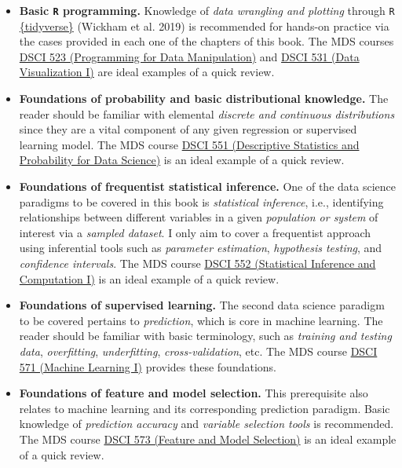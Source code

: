 \documentclass[
  letterpaper,
  DIV=11,
  numbers=noendperiod]{scrreprt}
\providecommand{\tightlist}{%
  \setlength{\itemsep}{0pt}\setlength{\parskip}{0pt}}\usepackage{longtable,booktabs,array}
\begin{document}
\begin{itemize}
\tightlist
\item
  \textbf{Basic \texttt{R} programming.} Knowledge of \emph{data
  wrangling and plotting} through \texttt{R}
  \href{https://www.tidyverse.org}{\{tidyverse\}} (Wickham et al. 2019)
  is recommended for hands-on practice via the cases provided in each
  one of the chapters of this book. The MDS courses
  \href{https://github.com/UBC-MDS/DSCI_523_r-prog}{DSCI 523
  (Programming for Data Manipulation)} and
  \href{https://github.com/UBC-MDS/DSCI_531_viz-1}{DSCI 531 (Data
  Visualization I)} are ideal examples of a quick review.
\item
  \textbf{Foundations of probability and basic distributional
  knowledge.} The reader should be familiar with elemental
  \emph{discrete and continuous distributions} since they are a vital
  component of any given regression or supervised learning model. The
  MDS course
  \href{https://ubc-mds.github.io/course-descriptions/DSCI_551_eda-dsci/}{DSCI
  551 (Descriptive Statistics and Probability for Data Science)} is an
  ideal example of a quick review.
\item
  \textbf{Foundations of frequentist statistical inference.} One of the
  data science paradigms to be covered in this book is \emph{statistical
  inference}, i.e., identifying relationships between different
  variables in a given \emph{population or system} of interest via a
  \emph{sampled dataset}. I only aim to cover a frequentist approach
  using inferential tools such as \emph{parameter estimation},
  \emph{hypothesis testing}, and \emph{confidence intervals}. The MDS
  course \href{https://github.com/UBC-MDS/DSCI_552_stat-inf-1}{DSCI 552
  (Statistical Inference and Computation I)} is an ideal example of a
  quick review.
\item
  \textbf{Foundations of supervised learning.} The second data science
  paradigm to be covered pertains to \emph{prediction}, which is core in
  machine learning. The reader should be familiar with basic
  terminology, such as \emph{training and testing data},
  \emph{overfitting}, \emph{underfitting}, \emph{cross-validation}, etc.
  The MDS course
  \href{https://github.com/UBC-MDS/DSCI_571_sup-learn-1}{DSCI 571
  (Machine Learning I)} provides these foundations.
\item
  \textbf{Foundations of feature and model selection.} This prerequisite
  also relates to machine learning and its corresponding prediction
  paradigm. Basic knowledge of \emph{prediction accuracy} and
  \emph{variable selection tools} is recommended. The MDS course
  \href{https://github.com/UBC-MDS/DSCI_573_feat-model-select}{DSCI 573
  (Feature and Model Selection)} is an ideal example of a quick review.
\end{itemize}
\end{document}
